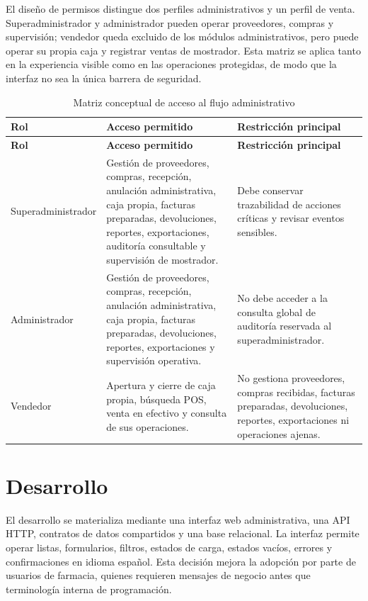 

El diseño de permisos distingue dos perfiles administrativos y un perfil de venta. Superadministrador y administrador pueden operar proveedores, compras y supervisión; vendedor queda excluido de los módulos administrativos, pero puede operar su propia caja y registrar ventas de mostrador. Esta matriz se aplica tanto en la experiencia visible como en las operaciones protegidas, de modo que la interfaz no sea la única barrera de seguridad.

\begin{longtable}{p{}p{}p{}}
\caption{Matriz conceptual de acceso al flujo administrativo}\\
\toprule
\textbf{Rol} & \textbf{Acceso permitido} & \textbf{Restricción principal}\\
\midrule
\endfirsthead
\toprule
\textbf{Rol} & \textbf{Acceso permitido} & \textbf{Restricción principal}\\
\midrule
\endhead
Superadministrador & Gestión de proveedores, compras, recepción, anulación administrativa, caja propia, facturas preparadas, devoluciones, reportes, exportaciones, auditoría consultable y supervisión de mostrador. & Debe conservar trazabilidad de acciones críticas y revisar eventos sensibles.\\
Administrador & Gestión de proveedores, compras, recepción, anulación administrativa, caja propia, facturas preparadas, devoluciones, reportes, exportaciones y supervisión operativa. & No debe acceder a la consulta global de auditoría reservada al superadministrador.\\
Vendedor & Apertura y cierre de caja propia, búsqueda POS, venta en efectivo y consulta de sus operaciones. & No gestiona proveedores, compras recibidas, facturas preparadas, devoluciones, reportes, exportaciones ni operaciones ajenas.\\
\bottomrule
\end{longtable}

\section{Desarrollo}

El desarrollo se materializa mediante una interfaz web administrativa, una API HTTP, contratos de datos compartidos y una base relacional. La interfaz permite operar listas, formularios, filtros, estados de carga, estados vacíos, errores y confirmaciones en idioma español. Esta decisión mejora la adopción por parte de usuarios de farmacia, quienes requieren mensajes de negocio antes que terminología interna de programación.

